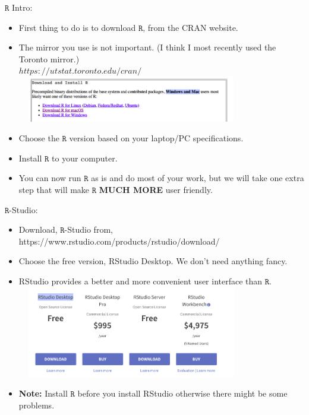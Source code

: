 \documentclass{beamer}
\begin{document}
	\begin{frame}{$\mathtt{R}$ Intro:}
		\begin{itemize}
			\item First thing to do is to download $\mathtt{R}$, from the CRAN website.
			\item The mirror you use is not important. (I think I most recently used the Toronto mirror.) \\
			\vspace{4pt}
			$https://utstat.toronto.edu/cran/$ \\
			\vspace{5pt}
			\includegraphics[width=10cm,height=2cm]{pic1.png}
			\vspace{4pt}
			\item Choose the $\mathtt{R}$ version based on your laptop/PC specifications. 
			\item Install $\mathtt{R}$ to your computer.
			\item You can now run $\mathtt{R}$ as is and do most of your work, but we will take one extra step that will make  $\mathtt{R}$ \textbf{MUCH MORE} user friendly.
		\end{itemize}
	\end{frame}
	
	\begin{frame}{$\mathtt{R}$-Studio:}
		\begin{itemize}
			\item Download, $\mathtt{R}$-Studio from, https://www.rstudio.com/products/rstudio/download/
			\item Choose the free version, RStudio Desktop. We don't need anything fancy.
			\item RStudio provides a better and more convenient user interface than $\mathtt{R}$.
			\includegraphics[width=10cm,height=4cm]{pic2.png}
			\item \textbf{Note:} Install $\mathtt{R}$ before you install RStudio otherwise there might be some problems.
			
		\end{itemize}
	\end{frame}
	
\end{document}
